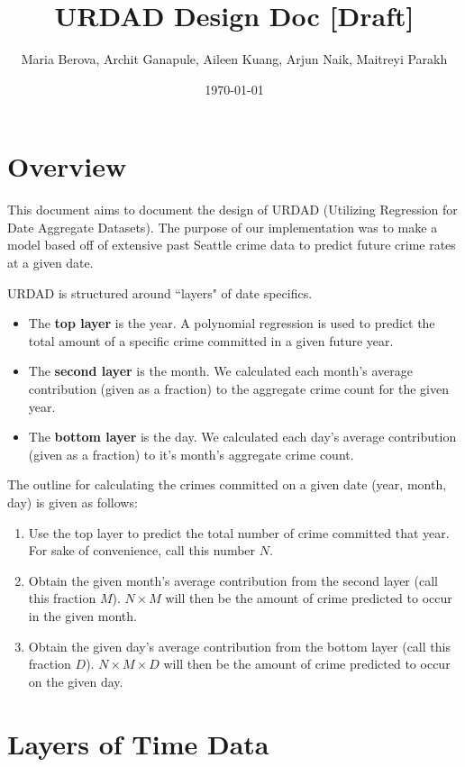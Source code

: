 \documentclass{article}
\title{\textbf{URDAD Design Doc [Draft]}}
\author{Maria Berova, Archit Ganapule, Aileen Kuang, Arjun Naik, Maitreyi Parakh}
\date{\today}
\begin{document}
\maketitle

\section{Overview}

This document aims to document the design of URDAD (Utilizing Regression for Date Aggregate Datasets). The purpose of our implementation was to make a model based off of extensive past Seattle crime data to predict future crime rates at a given date. \bigskip 

URDAD is structured around ``layers" of date specifics. 

\begin{itemize}
    \item The \textbf{top layer} is the year. A polynomial regression is used to predict the total amount of a specific crime committed in a given future year. 
    \item The \textbf{second layer} is the month. We calculated each month's average contribution (given as a fraction) to the aggregate crime count for the given year. 
    \item The \textbf{bottom layer} is the day. We calculated each day's average contribution (given as a fraction) to it's month's aggregate crime count. 
\end{itemize}

The outline for calculating the crimes committed on a given date (year, month, day) is given as follows:

\begin{enumerate}
    \item Use the top layer to predict the total number of crime committed that year. For sake of convenience, call this number $N$.
    \item Obtain the given month's average contribution from the second layer (call this fraction $M$). $N \times M$ will then be the amount of crime predicted to occur in the given month.
    \item Obtain the given day's average contribution from the bottom layer (call this fraction $D$). $N \times M \times D$ will then be the amount of crime predicted to occur on the given day.
\end{enumerate}

\section{Layers of Time Data}
\end{document}
